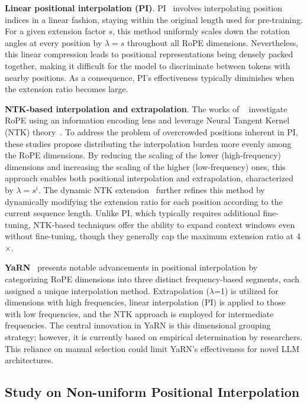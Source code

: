 \textbf{Linear positional interpolation (PI)}. PI~\cite{pi} involves interpolating position indices in a linear fashion, staying within the original length used for pre-training. For a given extension factor $s$, this method uniformly scales down the rotation angles at every position by $\lambda=s$ throughout all RoPE dimensions. Nevertheless, this linear compression leads to positional representations being densely packed together, making it difficult for the model to discriminate between tokens with nearby positions. As a consequence, PI's effectiveness typically diminishes when the extension ratio becomes large.

\textbf{NTK-based interpolation and extrapolation}. The works of ~\cite{ntk,dynamicntk} investigate RoPE using an information encoding lens and leverage Neural Tangent Kernel (NTK) theory~\cite{jacot2018neural,tancik2020fourier}. To address the problem of overcrowded positions inherent in PI, these studies propose distributing the interpolation burden more evenly among the RoPE dimensions. By reducing the scaling of the lower (high-frequency) dimensions and increasing the scaling of the higher (low-frequency) ones, this approach enables both positional interpolation and extrapolation, characterized by $\lambda=s^{i}$. The dynamic NTK extension~\cite{dynamicntk} further refines this method by dynamically modifying the extension ratio for each position according to the current sequence length. Unlike PI, which typically requires additional fine-tuning, NTK-based techniques offer the ability to expand context windows even without fine-tuning, though they generally cap the maximum extension ratio at 4$\times$.

\textbf{YaRN}~\cite{yarn} presents notable advancements in positional interpolation by categorizing RoPE dimensions into three distinct frequency-based segments, each assigned a unique interpolation method. Extrapolation ($\lambda$=1) is utilized for dimensions with high frequencies, linear interpolation (PI) is applied to those with low frequencies, and the NTK approach is employed for intermediate frequencies. The central innovation in YaRN is this dimensional grouping strategy; however, it is currently based on empirical determination by researchers. This reliance on manual selection could limit YaRN's effectiveness for novel LLM architectures.

\subsection{Study on Non-uniform Positional Interpolation}

